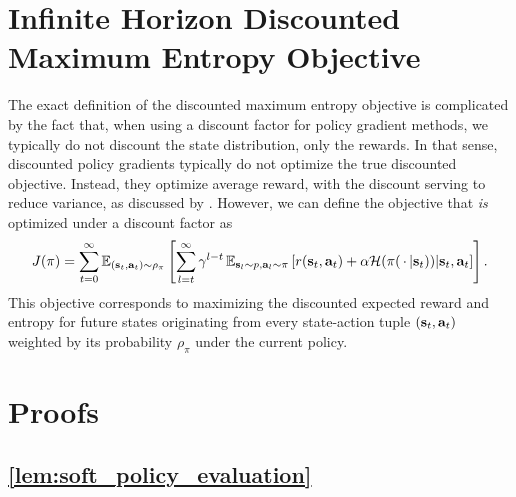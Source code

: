 \section{Infinite Horizon Discounted Maximum Entropy Objective}
\label{app:infinite_horizon_objective}
The exact definition of the discounted maximum entropy objective is complicated by the fact that, when using a discount factor for policy gradient methods, we typically do not discount the state distribution, only the rewards. In that sense, discounted policy gradients typically do not optimize the true discounted objective. Instead, they optimize average reward, with the discount serving to reduce variance, as discussed by \citet{thomas2014bias}. However, we can define the objective that \emph{is} optimized under a discount factor as
\begin{align}
J(\pi) = \sum_{t=0}^\infty \operatorname{\mathbb{E}}_{({\mathbf{s}_t},{\mathbf{a}_t}) \sim \rho_\pi}\left[ \sum_{l=t}^\infty \gamma^{l-t} \operatorname{\mathbb{E}}_{\mathbf{s}_l\sim p,\mathbf{a}_l\sim\pi}\left[ r({\mathbf{s}_t},{\mathbf{a}_t}) + \alpha \mathcal{H}(\pi({\,\cdot\,}|{\mathbf{s}_t}))|{\mathbf{s}_t},{\mathbf{a}_t}\right]\right].
\end{align}
This objective corresponds to maximizing the discounted expected reward and entropy for future states originating from every state-action tuple $({\mathbf{s}_t},{\mathbf{a}_t})$ weighted by its probability $\rho_\pi$ under the current policy.

\section{Proofs}

\subsection{\autoref{lem:soft_policy_evaluation}}
\label{app:lem_soft_policy_evaluation}



